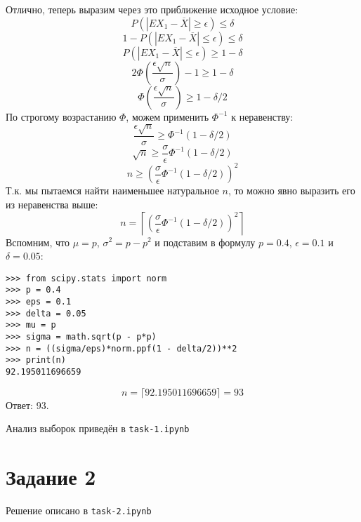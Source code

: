 \documentclass[12pt,a4paper]{article}
\begin{document}
Отлично, теперь выразим через это приближение исходное условие:
$$P(|EX_{1}-\overline{X}| \geq \epsilon) \leq \delta$$
$$1 - P(|EX_{1}-\overline{X}| \leq \epsilon) \leq \delta$$
$$P(|EX_{1}-\overline{X}| \leq \epsilon) \geq 1 - \delta$$
$$2\Phi\left(\frac{\epsilon \sqrt{n}}{\sigma}\right) - 1 \geq 1 - \delta$$
$$\Phi\left(\frac{\epsilon \sqrt{n}}{\sigma}\right) \geq 1 - \delta/2$$
По строгому возрастанию  $\Phi$, можем применить $\Phi^{-1}$ к неравенству:
$$\frac{\epsilon \sqrt{n}}{\sigma} \geq \Phi^{-1}\left(1 - \delta/2\right)$$
$$\sqrt{n} \geq \frac{\sigma}{\epsilon} \Phi^{-1}\left(1 - \delta/2\right)$$
$$n \geq \left(\frac{\sigma}{\epsilon} \Phi^{-1}\left(1 - \delta/2\right)\right)^2$$
Т.к. мы пытаемся найти наименьшее натуральное $n$, то можно явно выразить его из
неравенства выше:
$$n = \left\lceil\left(\frac{\sigma}{\epsilon} \Phi^{-1}\left(1 -
    \delta/2\right)\right)^2\right\rceil$$
Вспомним, что $\mu=p$, $\sigma^2=p-p^2$ и подставим в формулу $p=0.4$,
$\epsilon=0.1$ и $\delta=0.05$:
\begin{verbatim}
>>> from scipy.stats import norm
>>> p = 0.4
>>> eps = 0.1
>>> delta = 0.05
>>> mu = p
>>> sigma = math.sqrt(p - p*p)
>>> n = ((sigma/eps)*norm.ppf(1 - delta/2))**2
>>> print(n)
92.195011696659
\end{verbatim}

$$n=\lceil 92.195011696659 \rceil=93$$
Ответ: 93. \\
\par Анализ выборок приведён в \texttt{task-1.ipynb}
\section*{Задание 2}
Решение описано в \texttt{task-2.ipynb}
\end{document}
